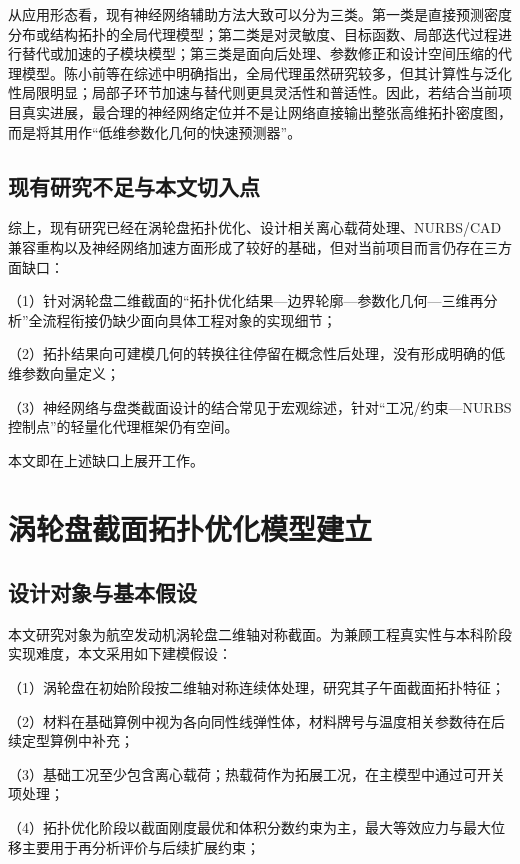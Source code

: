 \documentclass{FRB-style}
\begin{document}
从应用形态看，现有神经网络辅助方法大致可以分为三类。第一类是直接预测密度分布或结构拓扑的全局代理模型；第二类是对灵敏度、目标函数、局部迭代过程进行替代或加速的子模块模型；第三类是面向后处理、参数修正和设计空间压缩的代理模型\cite{Deng2022,Kong2024,Rastegarzadeh2023,Chandrasekhar2023,Persia2025}。陈小前等在综述中明确指出，全局代理虽然研究较多，但其计算性与泛化性局限明显；局部子环节加速与替代则更具灵活性和普适性\cite{Chen2024review}。因此，若结合当前项目真实进展，最合理的神经网络定位并不是让网络直接输出整张高维拓扑密度图，而是将其用作“低维参数化几何的快速预测器”。

\subsection{现有研究不足与本文切入点}

综上，现有研究已经在涡轮盘拓扑优化、设计相关离心载荷处理、NURBS/CAD 兼容重构以及神经网络加速方面形成了较好的基础，但对当前项目而言仍存在三方面缺口：

（1）针对涡轮盘二维截面的“拓扑优化结果—边界轮廓—参数化几何—三维再分析”全流程衔接仍缺少面向具体工程对象的实现细节；

（2）拓扑结果向可建模几何的转换往往停留在概念性后处理，没有形成明确的低维参数向量定义；

（3）神经网络与盘类截面设计的结合常见于宏观综述，针对“工况/约束—NURBS 控制点”的轻量化代理框架仍有空间。

本文即在上述缺口上展开工作。

\section{涡轮盘截面拓扑优化模型建立}

\subsection{设计对象与基本假设}

本文研究对象为航空发动机涡轮盘二维轴对称截面。为兼顾工程真实性与本科阶段实现难度，本文采用如下建模假设：

（1）涡轮盘在初始阶段按二维轴对称连续体处理，研究其子午面截面拓扑特征；

（2）材料在基础算例中视为各向同性线弹性体，材料牌号与温度相关参数待在后续定型算例中补充；

（3）基础工况至少包含离心载荷；热载荷作为拓展工况，在主模型中通过可开关项处理；

（4）拓扑优化阶段以截面刚度最优和体积分数约束为主，最大等效应力与最大位移主要用于再分析评价与后续扩展约束；
\end{document}
